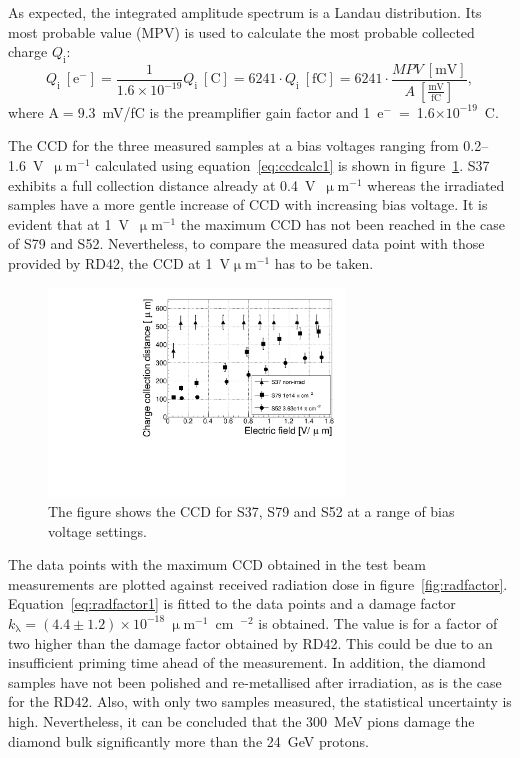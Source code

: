 As expected, the integrated amplitude spectrum is a Landau distribution. Its most probable value (MPV) is used to calculate the most probable collected charge $Q_\mathrm{i}$:
\begin{equation}
\label{eq:ccdcalc}
Q_\mathrm{i}~[\mathrm{e}^-] 
= \frac{1} {1.6\times 10^{-19}} Q_\mathrm{i}~[\mathrm{C}] 
= 6241 \cdot Q_\mathrm{i}~[\mathrm{fC}] 
= 6241 \cdot \frac{MPV~[\mathrm{mV}]}{A~[\frac{\mathrm{mV}}{\mathrm{fC}}]}
,
\end{equation} 
where A$=9.3$~mV/fC is the preamplifier gain factor and 1~e$^-$~=~1.6$\times10^{-19}$~C. 

The CCD for the three measured samples at a bias voltages ranging from 0.2--1.6~V~$\upmu$m$^{-1}$ calculated using equation~\ref{eq:ccdcalc1} is shown in figure~\ref{fig:ccd}. S37 exhibits a full collection distance already at 0.4~V~$\upmu$m$^{-1}$ whereas the irradiated samples have a more gentle increase of CCD with increasing bias voltage. It is evident that at 1~V~$\upmu$m$^{-1}$  the maximum CCD has not been reached in the case of S79 and S52. Nevertheless, to compare the measured data point with those provided by RD42, the CCD at 1~V$\upmu$m$^{-1}$ has to be taken.

\begin{figure}[!t]
\begin{center}
\includegraphics[width=0.7\textwidth]{03_measurement_results/scripts/plots/ccd}
\caption{The figure shows the CCD for S37, S79 and S52 at a range of bias voltage settings.}
\label{fig:ccd}
\end{center}
\end{figure}

The data points with the maximum CCD obtained in the test beam measurements are plotted against received radiation dose in figure~\ref{fig:radfactor}. Equation~\ref{eq:radfactor1} is fitted to the data points and a damage factor $k_{\mathrm{\lambda}}=(4.4\pm1.2)\times10^{-18}~\upmu$m$^{-1}$~cm~$^{-2}$ is obtained. The value is for a factor of two higher than the damage factor obtained by RD42. %
This could be due to an insufficient priming time ahead of the measurement. In addition, the diamond samples have not been polished and re-metallised after irradiation, as is the case for the RD42. Also, with only two samples measured, the statistical uncertainty is high. Nevertheless, it can be concluded that the 300~MeV pions damage the diamond bulk significantly more than the 24~GeV protons.


